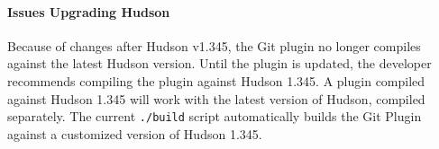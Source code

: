 \paragraph{Issues Upgrading Hudson}
Because of changes after Hudson v1.345, the Git plugin no longer
compiles against the latest Hudson version. Until the plugin is updated, the
developer recommends compiling the plugin against Hudson 1.345. A plugin 
compiled against Hudson 1.345 will work with the latest version of Hudson, compiled
separately. The current \texttt{./build} script automatically builds the
Git Plugin against a customized version of Hudson 1.345. 




%
